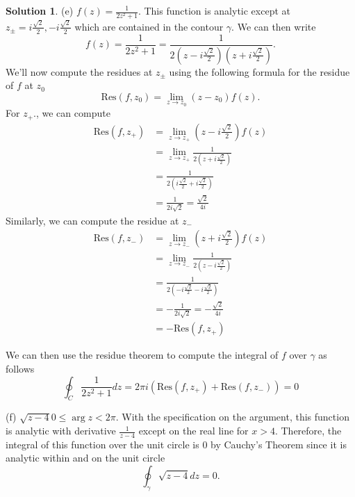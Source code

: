 \documentclass[12pt]{article}
\newcommand{\Res}{\text{Res}}
\theoremstyle{definition}
\newtheorem{sol}{Solution}
\theoremstyle{remark}
\begin{document}
\begin{sol}
    (e) $f(z) = \frac{1}{2z^2+1}$. This function is analytic except at $z_{\pm} = i\frac{\sqrt{2}}{2}, - i\frac{\sqrt{2}}{2}$ which are contained in the contour $\gamma$. We can then write 
    \begin{equation}
        f(z) = \frac{1}{2z^2 + 1} = \frac{1}{2(z - i\frac{\sqrt{2}}{2})(z + i\frac{\sqrt{2}}{2})}.
    \end{equation}
    We'll now compute the residues at $z_{\pm}$ using the following formula for the residue of $f$ at $z_0$ 
    \begin{equation}
        \Res(f, z_0) = \lim\limits_{z\to z_0} (z-z_0)f(z).
    \end{equation}
    For $z_{+}$., we can compute
    \begin{align}
        \Res(f,z_{+}) &= \lim\limits_{z\to z_+} \left(z - i\frac{\sqrt{2}}{2} \right)f(z)\\ 
                      &= \lim\limits_{z\to z_+} \frac{1}{2(z + i\frac{\sqrt{2}}{2})} \\
                      &= \frac{1}{2 \left(i\frac{\sqrt{2}}{2} + i\frac{\sqrt{2}}{2} \right)}\\
                      &= \frac{1}{2i\sqrt{2}} = \frac{\sqrt{2}}{4i}
    \end{align}
    Similarly, we can compute the residue at $z_{-}$
    \begin{align}
        \Res(f,z_{-}) &= \lim\limits_{z\to z_-} \left(z + i\frac{\sqrt{2}}{2} \right)f(z)\\ 
                      &= \lim\limits_{z\to z_-} \frac{1}{2(z - i\frac{\sqrt{2}}{2})} \\
                      &= \frac{1}{2 \left(-i\frac{\sqrt{2}}{2} - i\frac{\sqrt{2}}{2} \right)}\\
                      &= -\frac{1}{2i\sqrt{2}} = -\frac{\sqrt{2}}{4i}\\
                      &=  -\Res(f,z_{+}) 
    \end{align}

    We can then use the residue theorem to compute the integral of $f$ over $\gamma$ as follows
    \begin{equation}
        \oint_C \frac{1}{2z^2+1} dz = 2\pi i \left(  \Res(f,z_{+}) +   \Res(f,z_{-})    \right) = 0
    \end{equation}

    (f) $\sqrt{z-4} 0\leq\arg z<2\pi.$ With the specification on the argument, this function is analytic with derivative $\frac{1}{z-4}$ except on the real line for $x>4$. Therefore, the integral of this function over the unit circle is 0 by Cauchy's Theorem since it is analytic within and on the unit circle
    \begin{equation}
        \oint_{\gamma} \sqrt{z-4}dz = 0.
    \end{equation}
\end{sol}
\end{document}
